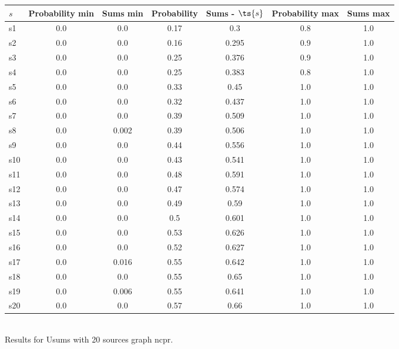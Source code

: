 \documentclass{article}
\begin{document}
\noindent\begin{tabular}{|l|c|c|c|c|c|c|}
\hline
$s$& Probability min & Sums min & Probability & Sums - $\ts{s}$ & Probability max & Sums max\\
\hline
s1 &0.0 & 0.0 & 0.17 & 0.3 & 0.8 & 1.0\\
\hline
s2 &0.0 & 0.0 & 0.16 & 0.295 & 0.9 & 1.0\\
\hline
s3 &0.0 & 0.0 & 0.25 & 0.376 & 0.9 & 1.0\\
\hline
s4 &0.0 & 0.0 & 0.25 & 0.383 & 0.8 & 1.0\\
\hline
s5 &0.0 & 0.0 & 0.33 & 0.45 & 1.0 & 1.0\\
\hline
s6 &0.0 & 0.0 & 0.32 & 0.437 & 1.0 & 1.0\\
\hline
s7 &0.0 & 0.0 & 0.39 & 0.509 & 1.0 & 1.0\\
\hline
s8 &0.0 & 0.002 & 0.39 & 0.506 & 1.0 & 1.0\\
\hline
s9 &0.0 & 0.0 & 0.44 & 0.556 & 1.0 & 1.0\\
\hline
s10 &0.0 & 0.0 & 0.43 & 0.541 & 1.0 & 1.0\\
\hline
s11 &0.0 & 0.0 & 0.48 & 0.591 & 1.0 & 1.0\\
\hline
s12 &0.0 & 0.0 & 0.47 & 0.574 & 1.0 & 1.0\\
\hline
s13 &0.0 & 0.0 & 0.49 & 0.59 & 1.0 & 1.0\\
\hline
s14 &0.0 & 0.0 & 0.5 & 0.601 & 1.0 & 1.0\\
\hline
s15 &0.0 & 0.0 & 0.53 & 0.626 & 1.0 & 1.0\\
\hline
s16 &0.0 & 0.0 & 0.52 & 0.627 & 1.0 & 1.0\\
\hline
s17 &0.0 & 0.016 & 0.55 & 0.642 & 1.0 & 1.0\\
\hline
s18 &0.0 & 0.0 & 0.55 & 0.65 & 1.0 & 1.0\\
\hline
s19 &0.0 & 0.006 & 0.55 & 0.641 & 1.0 & 1.0\\
\hline
s20 &0.0 & 0.0 & 0.57 & 0.66 & 1.0 & 1.0\\
\hline
\end{tabular}\\

\noindent Results for Usums with 20 sources graph ncpr.
\end{document}
